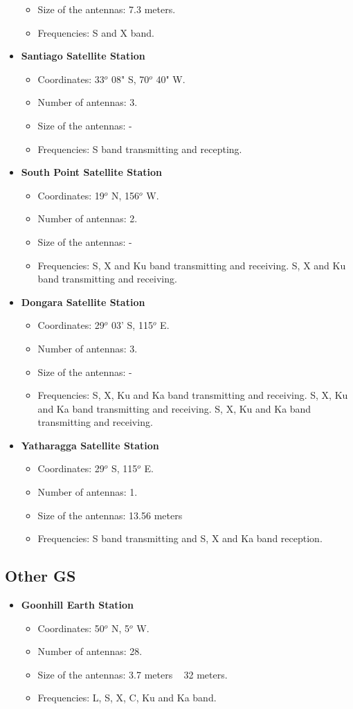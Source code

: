 \begin{itemize}
\begin{itemize}
\item Size of the antennas: 7.3 meters.
\item Frequencies: S and X band.
\end{itemize}
\item \textbf{Santiago Satellite Station}
\begin{itemize}
\item Coordinates: 33$^{o}$ 08" S, 70$^{o}$ 40" W.
\item Number of antennas: 3.
\item Size of the antennas: -
\item Frequencies: S band transmitting and recepting.
\end{itemize}
\item \textbf{South Point Satellite Station}
\begin{itemize}
\item Coordinates: 19$^{o}$ N, 156$^{o}$ W.
\item Number of antennas: 2.
\item Size of the antennas: -
\item Frequencies: S, X and Ku band transmitting and receiving. S, X and Ku band transmitting and receiving.
\end{itemize}
\item \textbf{Dongara Satellite Station}
\begin{itemize}
\item Coordinates: 29$^{o}$ 03' S, 115$^{o}$ E.
\item Number of antennas: 3.
\item Size of the antennas: -
\item Frequencies: S, X, Ku and Ka band transmitting and receiving. S, X, Ku and Ka band transmitting and receiving. S, X, Ku and Ka band transmitting and receiving.
\end{itemize}
\item \textbf{Yatharagga Satellite Station}
\begin{itemize}
\item Coordinates: 29$^{o}$ S, 115$^{o}$ E.
\item Number of antennas: 1.
\item Size of the antennas: 13.56 meters
\item Frequencies: S band transmitting and S, X and Ka band reception.
\end{itemize}
\end{itemize}
\subsection{Other GS}
\begin{itemize}
\item \textbf{Goonhill Earth Station}
\begin{itemize}
\item Coordinates: 50$^{o}$ N, 5$^{o}$ W.
\item Number of antennas: 28.
\item Size of the antennas: 3.7 meters ~ 32 meters.
\item Frequencies: L, S, X, C, Ku and Ka band.
\end{itemize}
\end{itemize}
